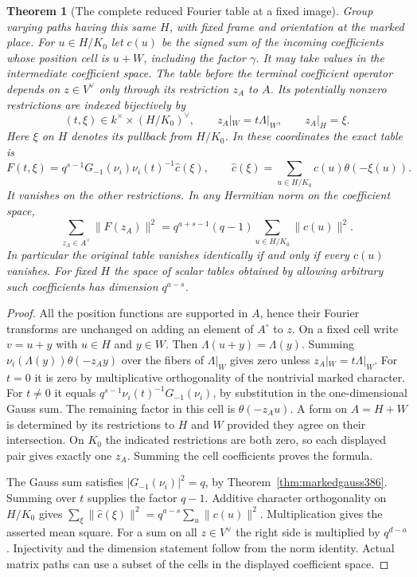 \documentclass[a4paper,11pt]{article}
\newtheorem{theorem}[proposition]{Theorem}
\theoremstyle{definition}
\theoremstyle{remark}
\numberwithin{equation}{section}
\begin{document}
\begin{theorem}[The complete reduced Fourier table at a fixed image]
\label{thm:markedimage393}
Group varying paths having this same \(H\), with fixed frame
and orientation at the marked place. For \(u\in H/K_0\)
let \(c(u)\) be the signed sum of the incoming coefficients
whose position cell is \(u+W\), including the factor \(\gamma\).
It may take values in the intermediate coefficient space.
The table before the terminal coefficient operator depends
on \(z\in V^\vee\) only through its restriction \(z_A\) to \(A\).
Its potentially nonzero restrictions are indexed bijectively by
\[
 (t,\xi)\in k^\times\times (H/K_0)^\vee,\qquad
 z_A|_W=t\Lambda|_W,\qquad z_A|_H=\xi .
\]
Here \(\xi\) on \(H\) denotes its pullback from \(H/K_0\).
In these coordinates the exact table is
\[
 F(t,\xi)=q^{s-1}G_{-1}(\nu_i)\nu_i(t)^{-1}\widehat c(\xi),
 \qquad
 \widehat c(\xi)=\sum_{u\in H/K_0} c(u)\theta(-\xi(u)).
\]
It vanishes on the other restrictions. In any Hermitian norm
on the coefficient space,
\[
       \sum_{z_A\in A^\vee}\|F(z_A)\|^2
              =q^{a+s-1}(q-1)\sum_{u\in H/K_0}\|c(u)\|^2 .
\]
In particular the original table vanishes identically if and
only if every \(c(u)\) vanishes. For fixed \(H\) the space
of scalar tables obtained by allowing arbitrary such
coefficients has dimension \(q^{a-s}\).
\end{theorem}
\begin{proof}
All the position functions are supported in \(A\), hence
their Fourier transforms are unchanged on adding an element
of \(A^\circ\) to \(z\). On a fixed cell write \(v=u+y\)
with \(u\in H\) and \(y\in W\). Then
\(\Lambda(u+y)=\Lambda(y)\). Summing
\(\nu_i(\Lambda(y))\theta(-z_A y)\) over the fibers of
\(\Lambda|_W\) gives zero unless \(z_A|_W=t\Lambda|_W\).
For \(t=0\) it is zero by multiplicative orthogonality of
the nontrivial marked character. For \(t\ne0\) it equals
\(q^{s-1}\nu_i(t)^{-1}G_{-1}(\nu_i)\), by substitution in
the one-dimensional Gauss sum. The remaining factor in this
cell is \(\theta(-z_Au)\). A form on \(A=H+W\) is determined
by its restrictions to \(H\) and \(W\) provided they agree
on their intersection. On \(K_0\) the indicated restrictions
are both zero, so each displayed pair gives exactly one \(z_A\).
Summing the cell coefficients proves the formula.

The Gauss sum satisfies \(|G_{-1}(\nu_i)|^2=q\), by
Theorem~\ref{thm:markedgauss386}. Summing over \(t\) supplies
the factor \(q-1\). Additive character orthogonality on
\(H/K_0\) gives
\(\sum_\xi\|\widehat c(\xi)\|^2=q^{a-s}\sum_u\|c(u)\|^2\).
Multiplication gives the asserted mean square. For a sum on
all \(z\in V^\vee\) the right side is multiplied by
\(q^{d-a}\). Injectivity and the dimension statement follow
from the norm identity. Actual matrix paths can use a subset
of the cells in the displayed coefficient space.
\end{proof}
\end{document}
